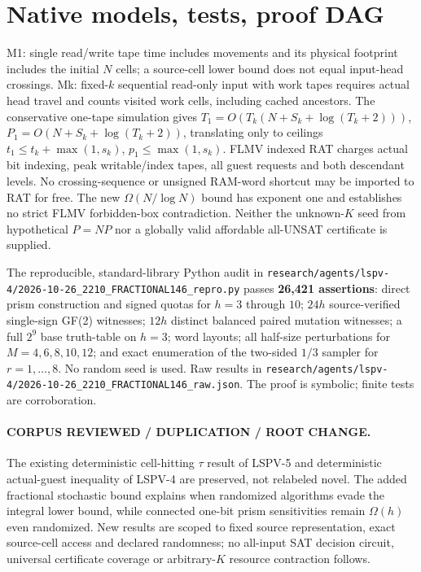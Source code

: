 \documentclass[11pt]{article}
\begin{document}
\section{Native models, tests, proof DAG}
M1: single read/write tape time includes movements and its physical footprint includes the initial $N$ cells; a source-cell lower bound does not equal input-head crossings. Mk: fixed-$k$ sequential read-only input with work tapes requires actual head travel and counts visited work cells, including cached ancestors. The conservative one-tape simulation gives $T_1=O(T_k(N+S_k+\log(T_k+2)))$, $P_1=O(N+S_k+\log(T_k+2))$, translating only to ceilings $t_1\le t_k+\max(1,s_k)$, $p_1\le\max(1,s_k)$. FLMV indexed RAT charges actual bit indexing, peak writable/index tapes, all guest requests and both descendant levels. No crossing-sequence or unsigned RAM-word shortcut may be imported to RAT for free. The new $\Omega(N/\log N)$ bound has exponent one and establishes no strict FLMV forbidden-box contradiction. Neither the unknown-$K$ seed from hypothetical $P=NP$ nor a globally valid affordable all-UNSAT certificate is supplied.

The reproducible, standard-library Python audit in \texttt{research/agents/lspv-4/2026-10-26_2210_FRACTIONAL146_repro.py} passes \textbf{26,421 assertions}: direct prism construction and signed quotas for $h=3$ through $10$; $24h$ source-verified single-sign GF(2) witnesses; $12h$ distinct balanced paired mutation witnesses; a full $2^9$ base truth-table on $h=3$; word layouts; all half-size perturbations for $M=4,6,8,10,12$; and exact enumeration of the two-sided $1/3$ sampler for $r=1,\ldots,8$. No random seed is used. Raw results in \texttt{research/agents/lspv-4/2026-10-26_2210_FRACTIONAL146_raw.json}. The proof is symbolic; finite tests are corroboration.

\paragraph{CORPUS REVIEWED / DUPLICATION / ROOT CHANGE.}
The existing deterministic cell-hitting $\tau$ result of LSPV-5 and deterministic actual-guest inequality of LSPV-4 are preserved, not relabeled novel. The added fractional stochastic bound explains when randomized algorithms evade the integral lower bound, while connected one-bit prism sensitivities remain $\Omega(h)$ even randomized. New results are scoped to fixed source representation, exact source-cell access and declared randomness; no all-input SAT decision circuit, universal certificate coverage or arbitrary-$K$ resource contraction follows.
\end{document}
